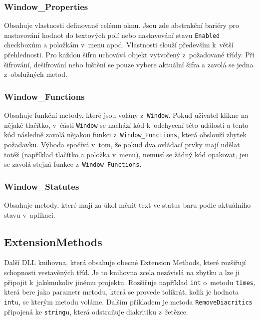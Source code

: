\documentclass[12pt]{article}
\theoremstyle{definition}
\newcommand{\code}[1]{\texttt{#1}}
\begin{document}
\subsubsection{Window\_Properties}
Obsahuje vlastnosti definované celému oknu. Jsou zde abstrakční bariéry pro nastavování hodnot do textových polí nebo nastavování stavu \code{Enabled} checkboxům a položkám v~menu apod. Vlastnosti slouží především k~větší přehlednosti. Pro každou šifru uchovává objekt vytvořený z~požadované třídy. Při šifrování, dešifrování nebo luštění se pouze vybere aktuální šifra a zavolá se jedna z~obslužných metod.

\subsubsection{Window\_Functions}
Obsahuje funkční metody, které jsou volány z~\code{Window}. Pokud uživatel klikne na nějaké tlačítko, v~části \code{Window} se nachází kód k~odchycení této události a tento kód následně zavolá nějakou funkci z~\code{Window\_Functions}, která obslouží zbytek požadavku. Výhoda spočívá v~tom, že pokud dva ovládací prvky mají udělat totéž (například tlačítko a položka v~menu), nemusí se žádný kód opakovat, jen se zavolá stejná funkce z~\code{Window\_Functions}.

\subsubsection{Window\_Statutes}
Obsahuje metody, které mají za úkol měnit text ve status baru podle aktuálního stavu v~aplikaci. 



\subsection{ExtensionMethods}
Další DLL knihovna, která obsahuje obecné Extension Methods, které rozšiřují schopnosti vestavěných tříd. Je to knihovna zcela nezávislá na zbytku a lze ji připojit k~jakémukoliv jinému projektu. Rozšiřuje například \code{int} o~metodu \code{times}, která bere jako parametr metodu, která se provede tolikrát, kolik je hodnota \code{int}u, se kterým metodu voláme. Dalším příkladem je metoda \code{RemoveDiacritics} připojená ke \code{string}u, která odstraňuje diakritiku z~řetězce. 









\newpage
\end{document}
